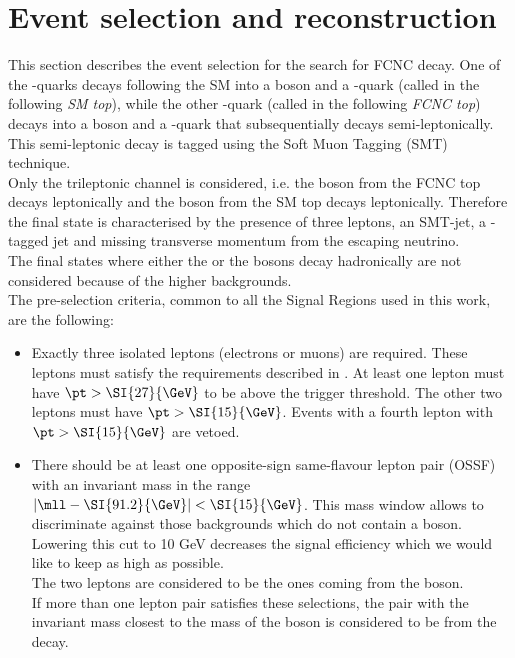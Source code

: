\section{Event selection and reconstruction}
\label{sec:selection}
This section describes the event selection for the search for FCNC \tZc decay.
One of the \Pqt-quarks decays following the SM into a \PW boson and a
\Pqb-quark (called in the following \textit{SM top}), while the other
\Pqt-quark (called in the following \textit{FCNC top}) decays into a \PZ
boson and a \Pqc-quark that subsequentially decays semi-leptonically.
This semi-leptonic decay is tagged using the Soft Muon Tagging (SMT) technique. \\
Only the trileptonic channel is considered, i.e. the \PZ boson from the
FCNC top decays leptonically and the \PW boson from the SM top
decays leptonically.
Therefore the final state is characterised by the presence of three leptons, an
SMT-jet, a \Pqb-tagged jet and missing transverse momentum from the
escaping neutrino. \\
The final states where either the \PZ or the \PW bosons decay
hadronically are not considered because of the higher backgrounds.\\
The pre-selection criteria, common to all the Signal Regions used in this work, are the following:
\begin{itemize}
	\item    Exactly three isolated leptons (electrons or muons) are required. 
				These leptons must satisfy the requirements described in
				. 
				At least one lepton must have $\pt > \SI{27}{\GeV}$ to be above the trigger threshold.
				The other two leptons must have $\pt > \SI{15}{\GeV}$. 
				Events with a fourth lepton with $\pt > \SI{15}{\GeV}$ are vetoed. 
	\item   There should be at least one opposite-sign same-flavour lepton pair
				(OSSF) with an invariant mass in the range 
				$|\mll - \SI{91.2}{\GeV}| < \SI{15}{\GeV}$.
				This mass window allows to discriminate against those backgrounds which do not contain a \PZ boson. Lowering this cut to 10 GeV decreases the signal efficiency which we would like to keep as high as possible.\\			 
				The two leptons are considered to be the ones coming from the \PZ boson.\\ 	
				If more than one lepton pair satisfies these selections, the pair
				with the invariant mass closest to the mass of the \PZ boson is
				considered to be from the \PZ decay. 
\end{itemize}	

